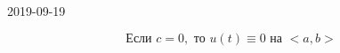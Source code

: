 \documentclass[main]{subfiles}
\begin{document}
\begin{lect}{2019-09-19}
		\begin{Consequence}
				\[\text{Если } c = 0, \text{ то } u(t) \equiv 0 \text{ на } <a, b>\]
		\end{Consequence}
\end{lect}
\end{document}

